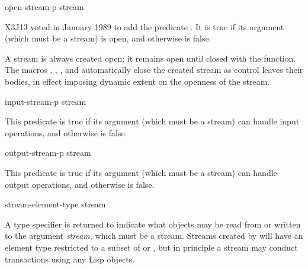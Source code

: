 \begin{newer}
\begin{defun}[Function]
open-stream-p stream

X3J13 voted in January 1989 
to add the predicate .
It is true if its argument (which must be a stream)
is open, and otherwise is false.

A stream is always created open; it remains open until closed
with the  function.  The macros ,
, ,
and  automatically close the created stream
as control leaves their bodies, in effect imposing dynamic extent
on the openness of the stream.
\end{defun}
\end{newer}

\begin{defun}[Function]
input-stream-p stream

This predicate is true if its argument (which must be a stream) can handle
input operations, and otherwise is false.
\end{defun}

\begin{defun}[Function]
output-stream-p stream

This predicate is true if its argument (which must be a stream) can handle
output operations, and otherwise is false.
\end{defun}

\begin{defun}[Function]
stream-element-type stream

A type specifier is returned to indicate what objects
may be read from or written to the argument \emph{stream}, which must be a stream.
Streams created by  will have an element type
restricted to a subset of  or ,
but in principle a stream may conduct transactions using any
Lisp objects.
\end{defun}

